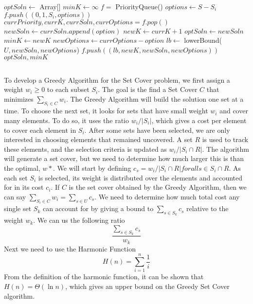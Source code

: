 \documentclass{article}
\begin{document}
\begin{algorithm}
\begin{algorithmic}[1]
	\State $optSoln \gets$ Array[]
	\State $minK \gets \infty$
	\State $f = $ PriorityQueue()
		\State $options \gets S - S_i$
		\State $f.push((0, 1, S_i, options))$
	\EndFor
		\State $currPriority, currK, currSoln, currOptions = f.pop()$
			\State $newSoln \gets currSoln.append(option)$
			\State $newK \gets currK + 1$
				\State $optSoln \gets newSoln$
				\State $minK \gets newK$
			\Else
				\State $newOptions \gets currOptions - option$
				\State $lb \gets $ lowerBound($U, newSoln, newOptions$)
					\State $f.push((lb, newK, newSoln, newOptions))$
				\EndIf
			\EndIf
		\EndFor
	\EndWhile
	\State \Return $optSoln, minK$
\EndFunction
\end{algorithmic}
\end{algorithm}

\subsection{}

To develop a Greedy Algorithm for the Set Cover problem, we first assign a weight $w_i \geq 0$ to each subset $S_i$. The goal is the find a Set Cover $C$ that minimizes $\sum_{S_i \in C} w_i$. The Greedy Algorithm will build the solution one set at a time. To choose the next set, it looks for sets that have small weight $w_i$ and cover many elements. To do so, it uses the ratio $w_i/|S_i|$, which gives a cost per element to cover each element in $S_i$. After some sets have been selected, we are only interested in choosing elements that remained uncovered. A set $R$ is used to track these elements, and the selection criteria is updated as $w_i/|S_i \cap R|$. The algorithm will generate a set cover, but we need to determine how much larger this is than the optimal, $w*$. We will start by defining $c_s = w_i/|S_i \cap R| for all s \in S_i \cap R$. As each set $S_i$ is selected, its weight is distributed over the elements and accounted for in its cost $c_i$. If $C$ is the set cover obtained by the Greedy Algorithm, then we can say $\sum_{S_i \in C} w_i = \sum_{s \in U} c_s$. We need to determine how much total cost any single set $S_k$ can account for by giving a bound to $\sum_{s \in S_k} c_s$ relative to the weight $w_k$. We can us the following ratio $$\frac{\sum_{s \in S_k} c_s}{w_k}$$ Next we need to use the Harmonic Function $$H(n)=\sum_{i=1}^{n} \frac{1}{i}$$ From the definition of the harmonic function, it can be shown that $H(n)=\Theta(\ln n)$, which gives an upper bound on the Greedy Set Cover algorithm.
\end{document}
